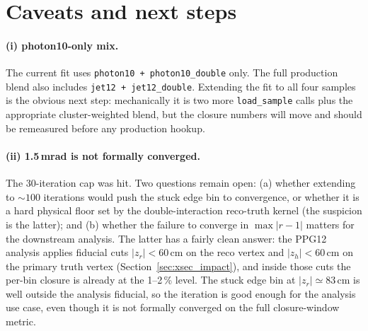 \documentclass[11pt,a4paper]{article}
\begin{document}
\section{Caveats and next steps}
\label{sec:caveats}

\paragraph{(i) photon10-only mix.}
The current fit uses \texttt{photon10 + photon10\_double} only. The
full production blend also includes \texttt{jet12 + jet12\_double}.
Extending the fit to all four samples is the obvious next step:
mechanically it is two more \texttt{load\_sample} calls plus the
appropriate cluster-weighted blend, but the closure numbers will move
and should be remeasured before any production hookup.

\paragraph{(ii) 1.5\,mrad is not formally converged.}
The 30-iteration cap was hit. Two questions remain open: (a) whether
extending to $\sim\!100$ iterations would push the stuck edge bin to
convergence, or whether it is a hard physical floor set by the
double-interaction reco-truth kernel (the suspicion is the latter);
and (b) whether the failure to converge in $\max|r-1|$ matters for the
downstream analysis. The latter has a fairly clean answer: the PPG12
analysis applies fiducial cuts $|z_r|<60$\,cm on the reco vertex and
$|z_h|<60$\,cm on the primary truth vertex
(Section~\ref{sec:xsec_impact}), and inside those cuts the per-bin
closure is already at the 1--2\,\% level. The stuck edge bin at
$|z_r|\!\simeq\!83$\,cm is well outside the analysis fiducial, so the
iteration is good enough for the analysis use case, even though it is
not formally converged on the full closure-window metric.
\end{document}
